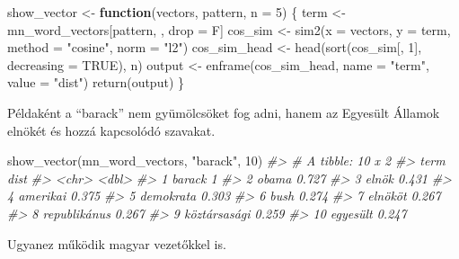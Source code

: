\documentclass[
]{book}
\newenvironment{Shaded}{\begin{snugshade}}{\end{snugshade}}
\newcommand{\AttributeTok}[1]{\textcolor[rgb]{0.77,0.63,0.00}{#1}}
\newcommand{\CommentTok}[1]{\textcolor[rgb]{0.56,0.35,0.01}{\textit{#1}}}
\newcommand{\ConstantTok}[1]{\textcolor[rgb]{0.00,0.00,0.00}{#1}}
\newcommand{\ControlFlowTok}[1]{\textcolor[rgb]{0.13,0.29,0.53}{\textbf{#1}}}
\newcommand{\DecValTok}[1]{\textcolor[rgb]{0.00,0.00,0.81}{#1}}
\newcommand{\FunctionTok}[1]{\textcolor[rgb]{0.00,0.00,0.00}{#1}}
\newcommand{\NormalTok}[1]{#1}
\newcommand{\OtherTok}[1]{\textcolor[rgb]{0.56,0.35,0.01}{#1}}
\newcommand{\StringTok}[1]{\textcolor[rgb]{0.31,0.60,0.02}{#1}}
\begin{document}
\begin{Shaded}
\begin{Highlighting}[]
\NormalTok{show\_vector }\OtherTok{\textless{}{-}} \ControlFlowTok{function}\NormalTok{(vectors, pattern, }\AttributeTok{n =} \DecValTok{5}\NormalTok{) \{}
\NormalTok{  term }\OtherTok{\textless{}{-}}\NormalTok{ mn\_word\_vectors[pattern, , drop }\OtherTok{=}\NormalTok{ F]}
\NormalTok{  cos\_sim }\OtherTok{\textless{}{-}} \FunctionTok{sim2}\NormalTok{(}\AttributeTok{x =}\NormalTok{ vectors, }\AttributeTok{y =}\NormalTok{ term, }\AttributeTok{method =} \StringTok{"cosine"}\NormalTok{, }\AttributeTok{norm =} \StringTok{"l2"}\NormalTok{)}
\NormalTok{  cos\_sim\_head }\OtherTok{\textless{}{-}} \FunctionTok{head}\NormalTok{(}\FunctionTok{sort}\NormalTok{(cos\_sim[, }\DecValTok{1}\NormalTok{], }\AttributeTok{decreasing =} \ConstantTok{TRUE}\NormalTok{), n)}
\NormalTok{  output }\OtherTok{\textless{}{-}} \FunctionTok{enframe}\NormalTok{(cos\_sim\_head, }\AttributeTok{name =} \StringTok{"term"}\NormalTok{, }\AttributeTok{value =} \StringTok{"dist"}\NormalTok{)}
  \FunctionTok{return}\NormalTok{(output)}
\NormalTok{\}}
\end{Highlighting}
\end{Shaded}

Példaként a ``barack'' nem gyümölcsöket fog adni, hanem az Egyesült
Államok elnökét és hozzá kapcsolódó szavakat.

\begin{Shaded}
\begin{Highlighting}[]
\FunctionTok{show\_vector}\NormalTok{(mn\_word\_vectors, }\StringTok{"barack"}\NormalTok{, }\DecValTok{10}\NormalTok{)}
\CommentTok{\#\textgreater{} \# A tibble: 10 x 2}
\CommentTok{\#\textgreater{}    term          dist}
\CommentTok{\#\textgreater{}    \textless{}chr\textgreater{}        \textless{}dbl\textgreater{}}
\CommentTok{\#\textgreater{}  1 barack       1    }
\CommentTok{\#\textgreater{}  2 obama        0.727}
\CommentTok{\#\textgreater{}  3 elnök        0.431}
\CommentTok{\#\textgreater{}  4 amerikai     0.375}
\CommentTok{\#\textgreater{}  5 demokrata    0.303}
\CommentTok{\#\textgreater{}  6 bush         0.274}
\CommentTok{\#\textgreater{}  7 elnököt      0.267}
\CommentTok{\#\textgreater{}  8 republikánus 0.267}
\CommentTok{\#\textgreater{}  9 köztársasági 0.259}
\CommentTok{\#\textgreater{} 10 egyesült     0.247}
\end{Highlighting}
\end{Shaded}

Ugyanez működik magyar vezetőkkel is.
\end{document}
